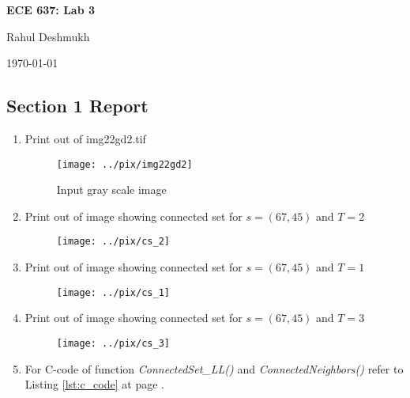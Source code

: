 \documentclass[a4paper,11pt]{article}
\newcommand{\reflst}[1]{Listing \ref{#1} at page \pageref{#1}}
\begin{document}
\begin{center}
\Large{\textbf{ECE 637: Lab 3}}

Rahul Deshmukh

\today
\end{center}

\subsection*{Section 1 Report} 

\begin{enumerate}
\item Print out of img22gd2.tif
\begin{figure}[!hp]
 \centering
 \texttt{[image: ../pix/img22gd2]}
 \caption{Input gray scale image}
\end{figure}

\newpage
\item Print out of image showing connected set for $s=(67,45)$ and $T=2$
\begin{figure}[!hp]
 \centering
 \texttt{[image: ../pix/cs\_2]}
\end{figure}

\newpage
\item Print out of image showing connected set for $s=(67,45)$ and $T=1$
\begin{figure}[!hp]
 \centering
 \texttt{[image: ../pix/cs\_1]}
\end{figure}

\newpage
\item Print out of image showing connected set for $s=(67,45)$ and $T=3$
\begin{figure}[!hp]
 \centering
 \texttt{[image: ../pix/cs\_3]}
\end{figure}

\item For C-code of function \textit{ConnectedSet\_LL()} and \textit{ConnectedNeighbors()} refer to \reflst{lst:c_code}.
\end{enumerate}

%
\clearpage
\vspace{2ex}
%
\end{document}
